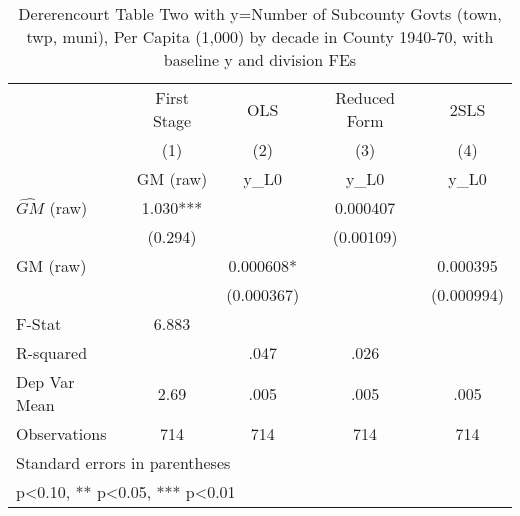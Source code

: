 \begin{table}[htbp]\centering
\def\sym#1{\ifmmode^{#1}\else\(^{#1}\)\fi}
\caption{Dererencourt Table Two with y=Number of Subcounty Govts (town, twp, muni), Per Capita (1,000) by decade in County 1940-70, with baseline y and division FEs}
\begin{tabular}{l*{4}{c}}
\toprule
                    & First Stage   &         OLS   &Reduced Form   &        2SLS   \\
                    &\multicolumn{1}{c}{(1)}&\multicolumn{1}{c}{(2)}&\multicolumn{1}{c}{(3)}&\multicolumn{1}{c}{(4)}\\
                    &\multicolumn{1}{c}{GM  (raw)}&\multicolumn{1}{c}{y\_L0}&\multicolumn{1}{c}{y\_L0}&\multicolumn{1}{c}{y\_L0}\\
\midrule
$\hat{GM}$ (raw)    &       1.030***&               &    0.000407   &               \\
                    &     (0.294)   &               &   (0.00109)   &               \\
\addlinespace
GM  (raw)           &               &    0.000608*  &               &    0.000395   \\
                    &               &  (0.000367)   &               &  (0.000994)   \\
\midrule
F-Stat              &       6.883   &               &               &               \\
R-squared           &               &        .047   &        .026   &               \\
Dep Var Mean        &        2.69   &        .005   &        .005   &        .005   \\
Observations        &         714   &         714   &         714   &         714   \\
\bottomrule
\multicolumn{5}{l}{\footnotesize Standard errors in parentheses}\\
\multicolumn{5}{l}{\footnotesize * p<0.10, ** p<0.05, *** p<0.01}\\
\end{tabular}
\end{table}
